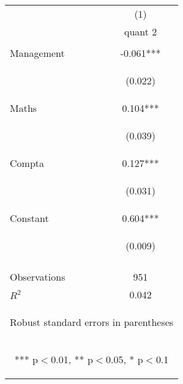 \begin{center}
\begin{tabular}{lc} \hline
 & (1) \\
 & quant 2 \\ \hline
\vspace{4pt} & \begin{footnotesize}\end{footnotesize} \\
Management & -0.061*** \\
\vspace{4pt} & \begin{footnotesize}(0.022)\end{footnotesize} \\
Maths & 0.104*** \\
\vspace{4pt} & \begin{footnotesize}(0.039)\end{footnotesize} \\
Compta & 0.127*** \\
\vspace{4pt} & \begin{footnotesize}(0.031)\end{footnotesize} \\
Constant & 0.604*** \\
 & \begin{footnotesize}(0.009)\end{footnotesize} \\
\vspace{4pt} & \begin{footnotesize}\end{footnotesize} \\
Observations & 951 \\
 $R^2$ & 0.042 \\ \hline
\multicolumn{2}{c}{\begin{footnotesize} Robust standard errors in parentheses\end{footnotesize}} \\
\multicolumn{2}{c}{\begin{footnotesize} *** p$<$0.01, ** p$<$0.05, * p$<$0.1\end{footnotesize}} \\
\end{tabular}
\end{center}